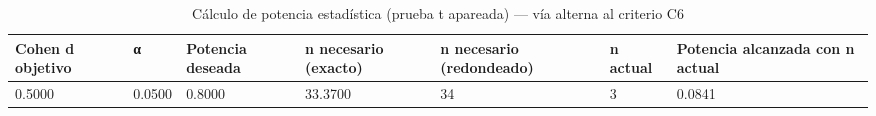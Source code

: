\begin{table}[htbp]
\centering
\caption{Cálculo de potencia estadística (prueba t apareada) — vía alterna al criterio C6}
\label{tab:power_calculation}
\begin{tabular}{lllllll}
\toprule
Cohen d objetivo & α & Potencia deseada & n necesario (exacto) & n necesario (redondeado) & n actual & Potencia alcanzada con n actual \\
\midrule
0.5000 & 0.0500 & 0.8000 & 33.3700 & 34 & 3 & 0.0841 \\
\bottomrule
\end{tabular}
\end{table}
